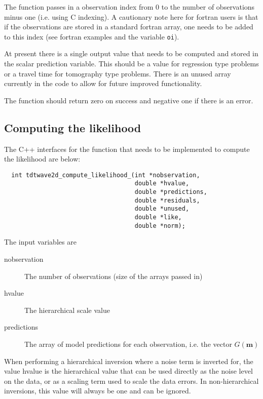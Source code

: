 \documentclass[a4paper,12pt]{article}
\begin{document}
The function passes in a observation index from 0 to the number of
observations minus one (i.e. using C indexing). A cautionary note here
for fortran users is that if the observations are stored in a standard
fortran array, one needs to be added to this index (see fortran
examples and the variable {\tt oi}).

At present there is a single output value that needs to be computed and
stored in the scalar prediction variable. This should be a value for regression
type problems or a travel time for tomography type problems. There is an unused
array currently in the code to allow for future improved functionality.

The function should return zero on success and negative one if there
is an error.

\subsection{Computing the likelihood}

The C++ interfaces for the function that needs to be implemented to
compute the likelihood are below:

\begin{verbatim}
  int tdtwave2d_compute_likelihood_(int *nobservation,
                                    double *hvalue,
                                    double *predictions,
                                    double *residuals,
                                    double *unused,
                                    double *like,
                                    double *norm);
\end{verbatim}

The input variables are

\begin{description}
\item[nobservation] The number of observations (size of the arrays passed in)
\item[hvalue] The hierarchical scale value
\item[predictions] The array of model predictions for each observation, i.e. the vector $G(\mathbf{m})$
\end{description}

When performing a hierarchical inversion where a noise term is
inverted for, the value hvalue is the hierarchical value that can be
used directly as the noise level on the data, or as a scaling term
used to scale the data errors. In non-hierarchical inversions, this value
will always be one and can be ignored.
\end{document}
